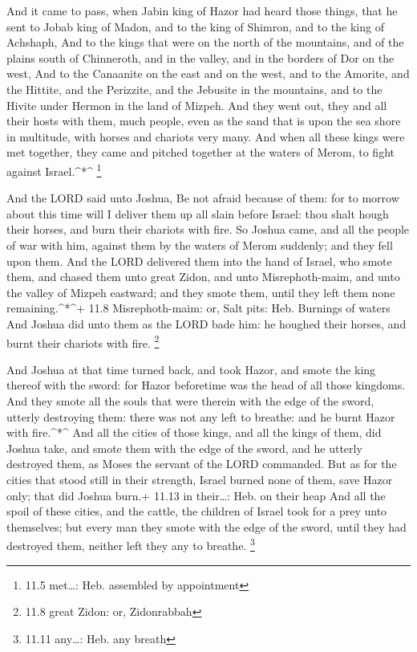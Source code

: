  And it came to pass, when Jabin king of Hazor had heard
those things, that he sent to Jobab king of Madon, and to the king of
Shimron, and to the king of Achshaph,  And to the kings that
were on the north of the mountains, and of the plains south of
Chinneroth, and in the valley, and in the borders of Dor on the west,
 And to the Canaanite on the east and on the west, and to
the Amorite, and the Hittite, and the Perizzite, and the Jebusite in the
mountains, and to the Hivite under Hermon in the land of Mizpeh.
 And they went out, they and all their hosts with them, much
people, even as the sand that is upon the sea shore in multitude, with
horses and chariots very many.  And when all these kings
were met together, they came and pitched together at the waters of
Merom, to fight against Israel.\^{}*\^{} \footnote{11.5 met\ldots: Heb.
  assembled by appointment}

 And the LORD said unto Joshua, Be not afraid because of
them: for to morrow about this time will I deliver them up all slain
before Israel: thou shalt hough their horses, and burn their chariots
with fire.  So Joshua came, and all the people of war with
him, against them by the waters of Merom suddenly; and they fell upon
them.  And the LORD delivered them into the hand of Israel,
who smote them, and chased them unto great Zidon, and unto
Misrephoth-maim, and unto the valley of Mizpeh eastward; and they smote
them, until they left them none remaining.\^{}*\^{}+ 11.8
Misrephoth-maim: or, Salt pits: Heb. Burnings of waters  And
Joshua did unto them as the LORD bade him: he houghed their horses, and
burnt their chariots with fire. \footnote{11.8 great Zidon: or,
  Zidonrabbah}

 And Joshua at that time turned back, and took Hazor, and
smote the king thereof with the sword: for Hazor beforetime was the head
of all those kingdoms.  And they smote all the souls that
were therein with the edge of the sword, utterly destroying them: there
was not any left to breathe: and he burnt Hazor with fire.\^{}*\^{}
 And all the cities of those kings, and all the kings of
them, did Joshua take, and smote them with the edge of the sword, and he
utterly destroyed them, as Moses the servant of the LORD commanded.
 But as for the cities that stood still in their strength,
Israel burned none of them, save Hazor only; that did Joshua burn.+
11.13 in their\ldots: Heb. on their heap  And all the spoil
of these cities, and the cattle, the children of Israel took for a prey
unto themselves; but every man they smote with the edge of the sword,
until they had destroyed them, neither left they any to breathe.
\footnote{11.11 any\ldots: Heb. any breath}

